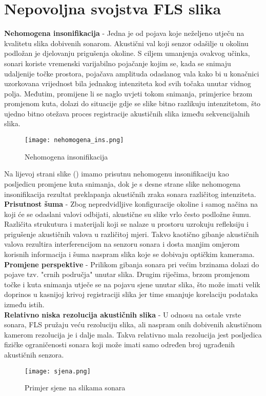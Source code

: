 \documentclass[times, utf8, diplomski]{fer}
\begin{document}
\section{Nepovoljna svojstva FLS slika}
\textbf{Nehomogena insonifikacija} - Jedna je od pojava koje neželjeno utječu na kvalitetu slika dobivenih sonarom. Akustični val koji senzor odašilje u okolinu  podložan je djelovanju prigušenja okoline. S ciljem umanjenja ovakvog učinka, sonari koriste vremenski varijabilno pojačanje kojim se, kada se snimaju udaljenije točke prostora, pojačava amplituda odaslanog vala kako bi u konačnici uzorkovana vrijednost bila jednakog intenziteta kod svih točaka unutar vidnog polja. Međutim, promijene li se naglo uvjeti tokom snimanja, primjerice brzom promjenom kuta, dolazi do situacije gdje se slike bitno razlikuju intenzitetom, što ujedno bitno otežava proces registracije akustičnih slika između sekvencijalnih slika.
\\
\begin{figure}[htb]
\centering
\texttt{[image: nehomogena\_ins.png]}
\caption{Nehomogena insonifikacija}
\label{fig:Nehomogena insonifikacija}
\end{figure}
Na lijevoj strani slike () imamo prisutnu nehomogenu insonifikaciju kao posljedicu promjene kuta snimanja, dok je s desne strane slike nehomogena insonifikacija rezultat preklapanja akustičnih zraka sonara različitog intenziteta.
\\
\textbf{Prisutnost šuma} - Zbog nepredvidljive konfiguracije okoline i samog načina na koji će se odaslani valovi odbijati, akustične su slike vrlo često podložne šumu. Različita strukutura i materijali koji se nalaze u prostoru uzrokuju refleksiju i prigušenje akustičnih valova u različitoj mjeri. Takvo kaotično gibanje akustičnih valova rezultira interferencijom na senzoru sonara i dosta manjim omjerom korisnih informacija i šuma naspram slika koje se dobivaju optičkim kamerama.
\\
\textbf{Promjene perspektive} - Prilikom gibanja sonara pri većim brzinama dolazi do pojave tzv. "crnih područja" unutar slika. Drugim riječima, brzom promjenom točke i kuta snimanja utječe se na pojavu sjene unutar slika, što može imati velik doprinos u kasnijoj krivoj registraciji slika jer time smanjuje korelaciju podataka između istih.
\\
\textbf{Relativno niska rezolucija akustičnih slika} - U odnosu na ostale vrste sonara, FLS pružaju veću rezoluciju slika, ali naspram onih dobivenih akustičnom kamerom rezolucija je i dalje mala. Takva relativno mala rezolucija jest posljedica fizičke ograničenosti sonara koji može imati samo određen broj ugrađenih akustičnih senzora.
\begin{figure}[htb]
\centering
\texttt{[image: sjena.png]}
\caption{Primjer sjene na slikama sonara}
\label{fig:sjena na slici sonara}
\end{figure}
\end{document}
